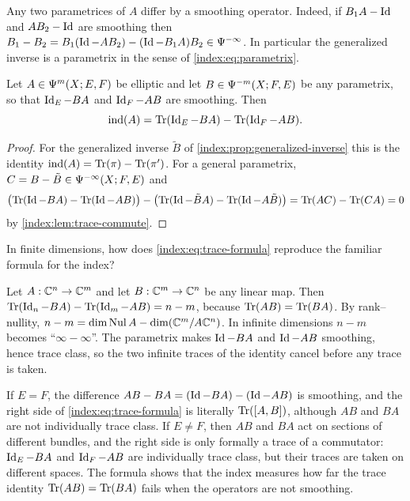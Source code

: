 Any two parametrices of $A$ differ by a smoothing operator. Indeed, if
$B_1A-\operatorname{Id}$ and $AB_2-\operatorname{Id}$ are smoothing then
$B_1-B_2=B_1(\operatorname{Id}-AB_2)-(\operatorname{Id}-B_1A)B_2\in\Psi^{-\infty}$. In particular the
generalized inverse is a parametrix in the sense of \eqref{index:eq:parametrix}.

\begin{theorem}\label{index:thm:trace-formula}
  Let $A\in\Psi^{m}(X;E,F)$ be elliptic and let $B\in\Psi^{-m}(X;F,E)$ be
  any parametrix, so that $\operatorname{Id}_E-BA$ and $\operatorname{Id}_F-AB$ are smoothing. Then
  \begin{equation}\label{index:eq:trace-formula}
    \operatorname{ind}(A)=\operatorname{Tr}(\operatorname{Id}_E-BA)-\operatorname{Tr}(\operatorname{Id}_F-AB).
  \end{equation}
\end{theorem}
\begin{proof}
  For the generalized inverse $\tilde B$ of
  \cref{index:prop:generalized-inverse} this is the identity
  $\operatorname{ind}(A)=\operatorname{Tr}(\pi)-\operatorname{Tr}(\pi')$. For a general parametrix,
  $C=B-\tilde B\in\Psi^{-\infty}(X;F,E)$ and
  \begin{equation*}
    \bigl(\operatorname{Tr}(\operatorname{Id}-BA)-\operatorname{Tr}(\operatorname{Id}-AB)\bigr)-
    \bigl(\operatorname{Tr}(\operatorname{Id}-\tilde BA)-\operatorname{Tr}(\operatorname{Id}-A\tilde B)\bigr)=\operatorname{Tr}(AC)-\operatorname{Tr}(CA)=0
  \end{equation*}
  by \cref{index:lem:trace-commute}.
\end{proof}

\begin{question}
  In finite dimensions, how does \eqref{index:eq:trace-formula} reproduce the
  familiar formula for the index?
\end{question}
\begin{answer}
  Let $A:\mathbb{C}^n\to\mathbb{C}^m$ and let $B:\mathbb{C}^m\to\mathbb{C}^n$ be any linear map. Then
  $\operatorname{Tr}(\operatorname{Id}_n-BA)-\operatorname{Tr}(\operatorname{Id}_m-AB)=n-m$, because $\operatorname{Tr}(AB)=\operatorname{Tr}(BA)$. By rank--nullity,
  $n-m=\dim\operatorname{Nul} A-\dim(\mathbb{C}^m/A\mathbb{C}^n)$. In infinite dimensions $n-m$ becomes
  ``$\infty-\infty$''. The parametrix makes $\operatorname{Id}-BA$ and $\operatorname{Id}-AB$ smoothing, hence
  trace class, so the two infinite traces of the identity cancel before any trace
  is taken.
\end{answer}

\begin{remark}\label{index:rem:sign}
  If $E=F$, the difference $AB-BA=(\operatorname{Id}-BA)-(\operatorname{Id}-AB)$ is smoothing, and the
  right side of \eqref{index:eq:trace-formula} is literally $\operatorname{Tr}([A,B])$,
  although $AB$ and $BA$ are not individually trace class. If $E\ne F$, then
  $AB$ and $BA$ act on sections of different bundles, and the right side is
  only formally a trace of a commutator: $\operatorname{Id}_E-BA$ and $\operatorname{Id}_F-AB$ are
  individually trace class, but their traces are taken on different spaces. The formula shows that the index measures how far the trace
  identity $\operatorname{Tr}(AB)=\operatorname{Tr}(BA)$ fails when the operators are not smoothing.
\end{remark}

